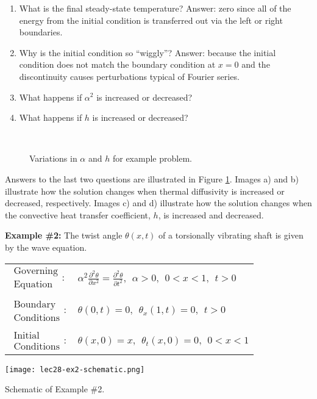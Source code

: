 \begin{enumerate}
\item What is the final steady-state temperature?  Answer: zero since all of the energy from the initial condition is transferred out via the left or right boundaries.

\item Why is the initial condition so ``wiggly''? Answer: because the initial condition does not match the boundary condition at $x=0$ and the discontinuity causes perturbations typical of Fourier series.

\item What happens if $\alpha^2$ is increased or decreased?

\item What happens if $h$ is increased or decreased?
  
\end{enumerate}
\begin{figure}[h!]
 \\
\label{fig:lec28-ex1-variations}
\caption{Variations in $\alpha$ and $h$ for example problem.}
\end{figure}
Answers to the last two questions are illustrated in Figure \ref{fig:lec28-ex1-variations}.  Images a) and b) illustrate how the solution changes when thermal diffusivity is increased or decreased, respectively.  Images c) and d) illustrate how the solution changes when the convective heat transfer coefficient, $h$, is increased and decreased.

\vspace{0.5cm}

\noindent\textbf{Example \#2:} The twist angle $\theta(x,t)$ of a torsionally vibrating shaft is given by the wave equation.

\begin{table}[h]
\begin{tabular}{l l}
$\substack{\text{Governing} \\\text{Equation}}: $& $\alpha^2 \frac{\partial^2 \theta}{\partial x^2} =  \frac{\partial^2 \theta}{\partial t^2},  \ \ \alpha>0, \ \ 0<x<1, \ \ t>0$ \\
& \\
$\substack{\text{Boundary} \\ \text{Conditions}}: $& $\theta(0,t)=0, \ \ \theta_x(1,t) = 0, \ \ t>0$\\
& \\
$\substack{\text{Initial} \\ \text{Conditions}}: $ & $\theta(x,0) = x, \ \ \theta_t(x,0) = 0, \ \ 0<x<1 $ \\
\end{tabular}
\end{table}
\begin{marginfigure}
\texttt{[image: lec28-ex2-schematic.png]}
\caption{Schematic of Example \#2.}
\label{fig:lec28-ex2-schematic}
\end{marginfigure}


